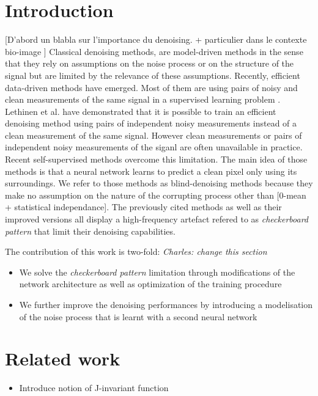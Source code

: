 \documentclass{article}
\begin{document}
\section{Introduction}
\label{sec:introduction}
[D'abord un blabla sur l'importance du denoising. + particulier dans le contexte bio-image ]
Classical denoising methods, are model-driven methods in the sense that they rely on assumptions on the noise process or on the structure of the signal but are limited by the relevance of these assumptions.
Recently, efficient data-driven methods have emerged. Most of them are using pairs of noisy and clean measurements of the same signal in a supervised learning problem \cite{weigert2017content}. Lethinen et al. have demonstrated that it is possible to train an efficient denoising method using pairs of independent noisy measurements instead of a clean measurement of the same signal\cite{lehtinen2018noise2noise}. However clean measurements or pairs of independent noisy measurements of the siganl are often unavailable in practice.
Recent self-supervised methods overcome this limitation\cite{batson2019noise2self,krull2018noise2void}. The main idea of those methods is that a neural network learns to predict a clean pixel only using its surroundings. We refer to those methods as blind-denoising methods because they make no assumption on the nature of the corrupting process other than [0-mean + statistical independance].
The previously cited methods as well as their improved versions all display a high-frequency artefact refered to as \textit{checkerboard pattern} that limit their denoising capabilities.

The contribution of this work is two-fold: \textit{Charles: change this section}
\begin{itemize}
\item We solve the \textit{checkerboard pattern} limitation through modifications of the network architecture as well as optimization of the training procedure
\item We further improve the denoising performances by introducing a modelisation of the noise process that is learnt with a second neural network
\end{itemize}

\section{Related work}
\label{sec:related}
\begin{itemize}
\item Introduce notion of J-invariant function
\end{itemize}
\end{document}
